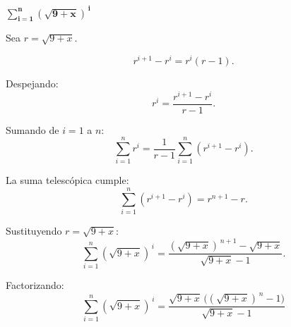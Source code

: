 $\displaystyle \mathbf{\sum_{i=1}^{n} (\sqrt{9+x})^{\,i}}$
\nopagebreak

Sea \(r=\sqrt{9+x}\).

\[
r^{i+1}-r^{i}=r^{i}(r-1).
\]

Despejando:
\[
r^{i}=\frac{r^{i+1}-r^{i}}{r-1}.
\]

Sumando de \(i=1\) a \(n\):
\[
\sum_{i=1}^{n} r^{i}
=
\frac{1}{r-1}\sum_{i=1}^{n}(r^{i+1}-r^{i}).
\]

La suma telescópica cumple:
\[
\sum_{i=1}^{n}(r^{i+1}-r^{i})
= r^{n+1}-r.
\]

Sustituyendo \(r=\sqrt{9+x}\):
\[
\sum_{i=1}^{n} (\sqrt{9+x})^{\,i}
=
\frac{(\sqrt{9+x})^{\,n+1}-\sqrt{9+x}}{\sqrt{9+x}-1}.
\]

Factorizando:
\[
\boxed{
\sum_{i=1}^{n} (\sqrt{9+x})^{\,i}
=
\frac{\sqrt{9+x}\,\big((\sqrt{9+x})^{\,n}-1\big)}{\sqrt{9+x}-1}
}
\]
